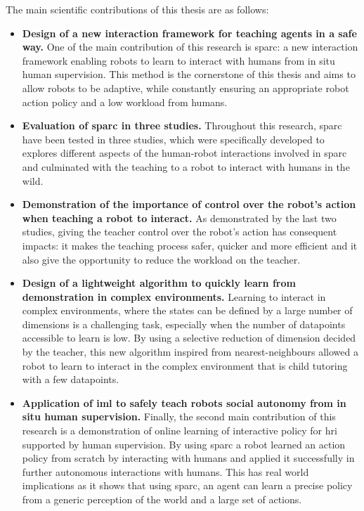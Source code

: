 The main scientific contributions of this thesis are as follows:
\begin{itemize}
	\item \textbf{Design of a new interaction framework for teaching agents in a safe way.} One of the main contribution of this research is \gls{sparc}: a new interaction framework enabling robots to learn to interact with humans from in situ human supervision. This method is the cornerstone of this thesis and aims to allow robots to be adaptive, while constantly ensuring an appropriate robot action policy and a low workload from humans.
	
	\item \textbf{Evaluation of \gls{sparc} in three studies.} Throughout this research, \gls{sparc} have been tested in three studies, which were specifically developed to explores different aspects of the human-robot interactions involved in \gls{sparc} and culminated with the teaching to a robot to interact with humans in the wild.
	
	\item \textbf{Demonstration of the importance of control over the robot's action when teaching a robot to interact.} As demonstrated by the last two studies, giving the teacher control over the robot's action has consequent impacts: it makes the teaching process safer, quicker and more efficient and it also give the opportunity to reduce the workload on the teacher.
	
	\item \textbf{Design of a lightweight algorithm to quickly learn from demonstration in complex environments.} Learning to interact in complex environments, where the states can be defined by a large number of dimensions is a challenging task, especially when the number of datapoints accessible to learn is low. By using a selective reduction of dimension decided by the teacher, this new algorithm inspired from nearest-neighbours allowed a robot to learn to interact in the complex environment that is child tutoring with a few datapoints. 
	
	\item \textbf{Application of \gls{iml} to safely teach robots social autonomy from in situ human supervision.} Finally, the second main contribution of this research is a demonstration of online learning of interactive policy for \gls{hri} supported by human supervision. By using \gls{sparc} a robot learned an action policy from scratch by interacting with humans and applied it successfully in further autonomous interactions with humans. This has real world implications as it shows that using \gls{sparc}, an agent can learn a precise policy from a generic perception of the world and a large set of actions. 
	
\end{itemize}

